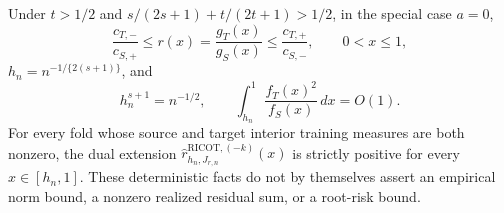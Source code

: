 Under \(t>1/2\) and \(s/(2s+1)+t/(2t+1)>1/2\), in the special case \(a=0\),
\[
\frac{c_{T,-}}{c_{S,+}}\le r(x)=\frac{g_T(x)}{g_S(x)}\le\frac{c_{T,+}}{c_{S,-}},\qquad 0<x\le1,
\]
\(h_n=n^{-1/\{2(s+1)\}}\), and
\[
h_n^{s+1}=n^{-1/2},\qquad \int_{h_n}^1\frac{f_T(x)^2}{f_S(x)}\,dx=O(1).
\]
For every fold whose source and target interior training measures are both nonzero, the dual extension \(\widehat r^{\mathrm{RICOT},(-k)}_{h_n,J_{r,n}}(x)\) is strictly positive for every \(x\in[h_n,1]\). These deterministic facts do not by themselves assert an empirical norm bound, a nonzero realized residual sum, or a root-risk bound.